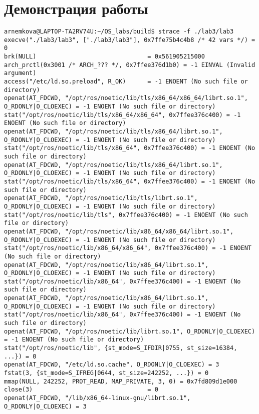 \documentclass[a4paper, 14pt]{article}
\begin{document}
\section*{Демонстрация работы}

\begin{lstlisting}
arnemkova@LAPTOP-TA2RV74U:~/OS_labs/build$ strace -f ./lab3/lab3
execve("./lab3/lab3", ["./lab3/lab3"], 0x7ffe75b4c4b8 /* 42 vars */) = 0
brk(NULL)                               = 0x561905215000
arch_prctl(0x3001 /* ARCH_??? */, 0x7ffee376d1b0) = -1 EINVAL (Invalid argument)
access("/etc/ld.so.preload", R_OK)      = -1 ENOENT (No such file or directory)
openat(AT_FDCWD, "/opt/ros/noetic/lib/tls/x86_64/x86_64/librt.so.1", O_RDONLY|O_CLOEXEC) = -1 ENOENT (No such file or directory)
stat("/opt/ros/noetic/lib/tls/x86_64/x86_64", 0x7ffee376c400) = -1 ENOENT (No such file or directory)
openat(AT_FDCWD, "/opt/ros/noetic/lib/tls/x86_64/librt.so.1", O_RDONLY|O_CLOEXEC) = -1 ENOENT (No such file or directory)
stat("/opt/ros/noetic/lib/tls/x86_64", 0x7ffee376c400) = -1 ENOENT (No such file or directory)
openat(AT_FDCWD, "/opt/ros/noetic/lib/tls/x86_64/librt.so.1", O_RDONLY|O_CLOEXEC) = -1 ENOENT (No such file or directory)
stat("/opt/ros/noetic/lib/tls/x86_64", 0x7ffee376c400) = -1 ENOENT (No such file or directory)
openat(AT_FDCWD, "/opt/ros/noetic/lib/tls/librt.so.1", O_RDONLY|O_CLOEXEC) = -1 ENOENT (No such file or directory)
stat("/opt/ros/noetic/lib/tls", 0x7ffee376c400) = -1 ENOENT (No such file or directory)
openat(AT_FDCWD, "/opt/ros/noetic/lib/x86_64/x86_64/librt.so.1", O_RDONLY|O_CLOEXEC) = -1 ENOENT (No such file or directory)
stat("/opt/ros/noetic/lib/x86_64/x86_64", 0x7ffee376c400) = -1 ENOENT (No such file or directory)
openat(AT_FDCWD, "/opt/ros/noetic/lib/x86_64/librt.so.1", O_RDONLY|O_CLOEXEC) = -1 ENOENT (No such file or directory)
stat("/opt/ros/noetic/lib/x86_64", 0x7ffee376c400) = -1 ENOENT (No such file or directory)
openat(AT_FDCWD, "/opt/ros/noetic/lib/x86_64/librt.so.1", O_RDONLY|O_CLOEXEC) = -1 ENOENT (No such file or directory)
stat("/opt/ros/noetic/lib/x86_64", 0x7ffee376c400) = -1 ENOENT (No such file or directory)
openat(AT_FDCWD, "/opt/ros/noetic/lib/librt.so.1", O_RDONLY|O_CLOEXEC) = -1 ENOENT (No such file or directory)
stat("/opt/ros/noetic/lib", {st_mode=S_IFDIR|0755, st_size=16384, ...}) = 0
openat(AT_FDCWD, "/etc/ld.so.cache", O_RDONLY|O_CLOEXEC) = 3
fstat(3, {st_mode=S_IFREG|0644, st_size=242252, ...}) = 0
mmap(NULL, 242252, PROT_READ, MAP_PRIVATE, 3, 0) = 0x7fd809d1e000
close(3)                                = 0
openat(AT_FDCWD, "/lib/x86_64-linux-gnu/librt.so.1", O_RDONLY|O_CLOEXEC) = 3

\end{lstlisting}
\end{document}
